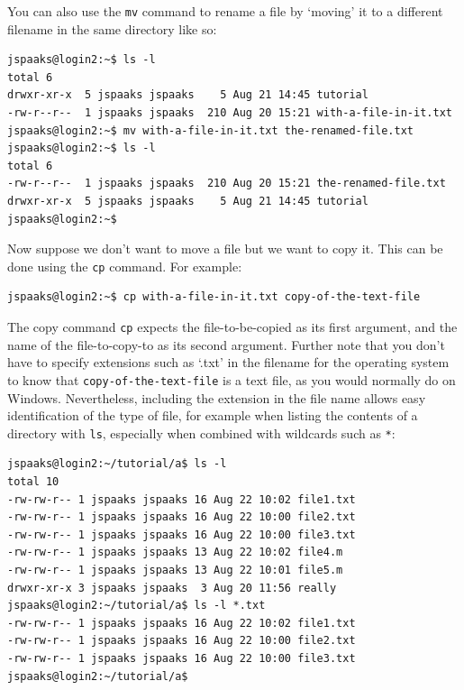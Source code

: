 You can also use the \lstinline[style=bashinline]{mv} command to rename a file by `moving' it to a different filename in the same directory like so:
\begin{lstlisting}[style=basic,style=bash]
jspaaks@login2:~$ ls -l
total 6
drwxr-xr-x  5 jspaaks jspaaks    5 Aug 21 14:45 tutorial
-rw-r--r--  1 jspaaks jspaaks  210 Aug 20 15:21 with-a-file-in-it.txt
jspaaks@login2:~$ mv with-a-file-in-it.txt the-renamed-file.txt
jspaaks@login2:~$ ls -l
total 6
-rw-r--r--  1 jspaaks jspaaks  210 Aug 20 15:21 the-renamed-file.txt
drwxr-xr-x  5 jspaaks jspaaks    5 Aug 21 14:45 tutorial
jspaaks@login2:~$
\end{lstlisting}


Now suppose we don't want to move a file but we want to copy it. This can be done using the \lstinline[style=bashinline]{cp} command. For example:
\begin{lstlisting}[style=basic,style=bash]
jspaaks@login2:~$ cp with-a-file-in-it.txt copy-of-the-text-file
\end{lstlisting}
The copy command \lstinline[style=bashinline]{cp} expects the file-to-be-copied as its first argument, and the name of the file-to-copy-to as its second argument. Further note that you don't have to specify extensions such as `.txt' in the filename for the operating system to know that \lstinline[style=bashinline]{copy-of-the-text-file} is a text file, as you would normally do on Windows. Nevertheless, including the extension in the file name allows easy identification of the type of file, for example when listing the contents of a directory with \lstinline[style=bashinline]{ls}, especially when combined with wildcards such as \lstinline[style=bashinline]{*}:


\begin{lstlisting}[style=basic,style=bash]
jspaaks@login2:~/tutorial/a$ ls -l
total 10
-rw-rw-r-- 1 jspaaks jspaaks 16 Aug 22 10:02 file1.txt
-rw-rw-r-- 1 jspaaks jspaaks 16 Aug 22 10:00 file2.txt
-rw-rw-r-- 1 jspaaks jspaaks 16 Aug 22 10:00 file3.txt
-rw-rw-r-- 1 jspaaks jspaaks 13 Aug 22 10:02 file4.m
-rw-rw-r-- 1 jspaaks jspaaks 13 Aug 22 10:01 file5.m
drwxr-xr-x 3 jspaaks jspaaks  3 Aug 20 11:56 really
jspaaks@login2:~/tutorial/a$ ls -l *.txt
-rw-rw-r-- 1 jspaaks jspaaks 16 Aug 22 10:02 file1.txt
-rw-rw-r-- 1 jspaaks jspaaks 16 Aug 22 10:00 file2.txt
-rw-rw-r-- 1 jspaaks jspaaks 16 Aug 22 10:00 file3.txt
jspaaks@login2:~/tutorial/a$
\end{lstlisting}



